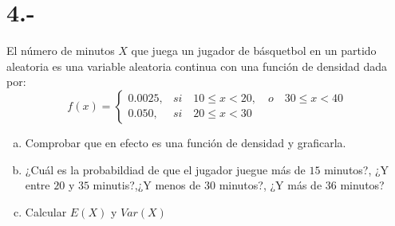 \documentclass{article}
\begin{document}
\section*{4.-}
El número de minutos $X$ que juega un jugador de básquetbol en un partido aleatoria es una variable aleatoria continua
con una función de densidad dada por:
\[ f(x) =
\begin{cases}
    0.0025, & si \quad 10 \leq x < 20, \quad o \quad 30 \leq x < 40 \\
    0.050, & si \quad 20 \leq x < 30
\end{cases}
\]

\begin{enumerate}[a)]
    \item Comprobar que en efecto es una función de densidad y graficarla.
    \item ¿Cuál es la probabildiad de que el jugador juegue más de $15$ minutos?, ¿Y entre $20$ y $35$ minutis?,¿Y menos de $30$ minutos?,
    ¿Y más de $36$ minutos?
    \item Calcular $E(X)$ y $Var(X)$
\end{enumerate}
\end{document}
